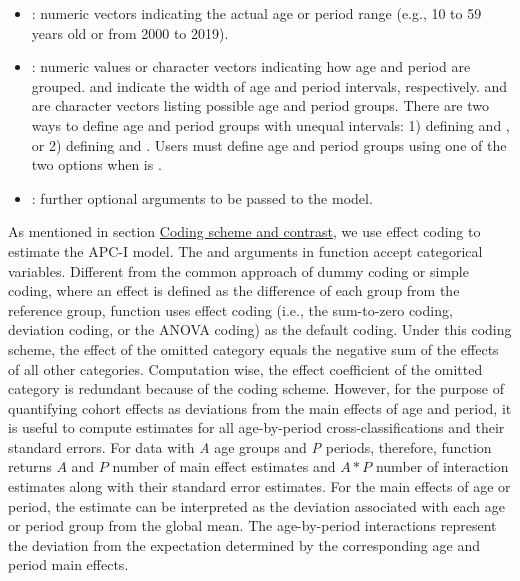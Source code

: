 \begin{itemize}
 \item{}:
numeric vectors indicating the actual age or period range (e.g., 10 to 59 years old or from 2000 to 2019).
  
  \item{}:{
numeric values or character vectors indicating how age and period are
grouped.  and  
indicate the width of age and period intervals, respectively.  and  are character vectors listing possible age and period groups. There are two ways to define age and period groups with unequal intervals: 1) defining  and , or 2) defining  and . Users must define age and period groups using one of the two options when  is .
  }
\item {}: further optional arguments to be passed to the model. 

\end{itemize}

As mentioned in section \hyperref[contrasts]{Coding scheme and contrast}, we use  effect coding to estimate the APC-I model. The {} and {} arguments in function {} accept categorical variables. Different from the common approach of dummy coding or simple coding, where an effect is defined as the difference of each group from the reference group, function {} uses effect coding (i.e., the sum-to-zero coding, deviation coding, or the ANOVA coding) as the default coding. Under this coding scheme, the effect of the omitted category equals the negative sum of the effects of all other categories. Computation wise, the effect coefficient of the omitted category is redundant because of the coding scheme. However, for the purpose of quantifying cohort effects as deviations from the main effects of age and period, it is useful to compute estimates for all age-by-period cross-classifications and their standard errors. For data with \textit{A} age groups and \textit{P} periods, therefore, function {} returns $A$ and $P$ number of main effect estimates and $A*P$ number of interaction estimates along with their standard error estimates. For the main effects of age or period, the estimate can be interpreted as the deviation associated with each age or period group from the global mean.  The age-by-period interactions represent the deviation from the expectation determined by the corresponding age and period main effects.  


